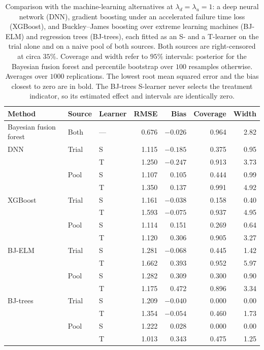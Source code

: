 \begin{table}[!tb]
  \centering
  \caption{Comparison with the machine-learning
    alternatives at $\lambda_d = \lambda_u = 1$: a deep neural network (DNN),
    gradient boosting under an accelerated failure time loss (XGBoost), and
    Buckley--James boosting over extreme learning machines (BJ-ELM) and
    regression trees (BJ-trees), each fitted as an S- and a T-learner on the
    trial alone and on a naive pool of both sources. Both sources are
    right-censored at circa $35\%$. Coverage and width refer to $95\%$
    intervals: posterior for the Bayesian fusion forest and percentile
    bootstrap over $100$ resamples otherwise. Averages over $1000$
    replications. The lowest root mean squared error and the bias closest to
    zero are in bold. The BJ-trees S-learner never selects
    the treatment indicator, so its estimated effect and intervals are
    identically zero.}
  \label{tab:sim-competitors}
  \small
  \begin{tabular}{@{}lll rrrr@{}}
    \toprule
    Method & Source & Learner & RMSE & Bias & Coverage & Width \\
    \midrule
    Bayesian fusion forest & Both & --- & $\mathbf{0.676}$ & $\mathbf{-0.026}$ & 0.964 & 2.82 \\
    \midrule
    DNN                    & Trial & S & 1.115 & $-0.185$ & 0.375 & 0.95 \\
                           &       & T & 1.250 & $-0.247$ & 0.913 & 3.73 \\
                           & Pool  & S & 1.107 & 0.105 & 0.444 & 0.99 \\
                           &       & T & 1.350 & 0.137 & 0.991 & 4.92 \\
    \addlinespace
    XGBoost                & Trial & S & 1.161 & $-0.038$ & 0.158 & 0.40 \\
                           &       & T & 1.593 & $-0.075$ & 0.937 & 4.95 \\
                           & Pool  & S & 1.114 & 0.151 & 0.269 & 0.64 \\
                           &       & T & 1.120 & 0.306 & 0.905 & 3.27 \\
    \addlinespace
    BJ-ELM                 & Trial & S & 1.281 & $-0.068$ & 0.445 & 1.42 \\
                           &       & T & 1.662 & 0.393 & 0.952 & 5.97 \\
                           & Pool  & S & 1.282 & 0.309 & 0.300 & 0.90 \\
                           &       & T & 1.175 & 0.472 & 0.896 & 3.34 \\
    \addlinespace
    BJ-trees               & Trial & S & 1.209 & $-0.040$ & 0.000 & 0.00 \\
                           &       & T & 1.354 & $-0.054$ & 0.460 & 1.73 \\
                           & Pool  & S & 1.222 & 0.028 & 0.000 & 0.00 \\
                           &       & T & 1.013 & 0.343 & 0.475 & 1.25 \\
    \bottomrule
  \end{tabular}
\end{table}

